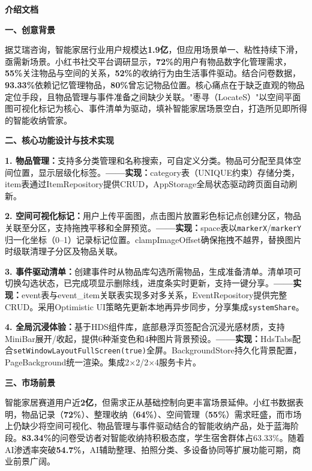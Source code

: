 \documentclass[UTF8,zihao=5,twoside]{ctexart}
\newcommand{\blankline}{\vspace{\baselineskip}\par}
\newcommand{\secondheading}[1]{{\noindent\zihao{4}\bfseries #1\par}}
\newcommand{\thirdheading}[1]{{\noindent\zihao{-4}\bfseries #1\par}}
\begin{document}
\blankline

\secondheading{介绍文档}

\blankline

\thirdheading{一、创意背景}

据艾瑞咨询，智能家居行业用户规模达\textbf{1.9亿}，但应用场景单一、粘性持续下滑，亟需新场景。小红书社交平台调研显示，\textbf{72\%}的用户有物品数字化管理需求，\textbf{55\%}关注物品与空间的关系，\textbf{52\%}的收纳行为由生活事件驱动。结合问卷数据，\textbf{93.33\%}依赖记忆管理物品，\textbf{80\%}曾忘记物品位置。核心痛点在于缺乏直观的物品定位手段，且物品管理与事件准备之间缺少关联。"枣寻（LocateS）"以空间平面图可视化标记为核心、事件清单为驱动，填补智能家居场景空白，打造所见即所得的智能收纳管家。

\thirdheading{二、核心功能设计与技术实现}

\textbf{1. 物品管理：}支持多分类管理和名称搜索，可自定义分类。物品可分配至具体空间位置，显示层级化标签。\textbf{——实现：}category表（UNIQUE约束）存储分类，item表通过ItemRepository提供CRUD，AppStorage全局状态驱动跨页面自动刷新。

\textbf{2. 空间可视化标记：}用户上传平面图，点击图片放置彩色标记点创建分区，物品关联至分区，支持拖拽平移和全屏预览。\textbf{——实现：}space表以\verb|markerX|/\verb|markerY|归一化坐标（0–1）记录标记位置。clampImageOffset确保拖拽不越界，替换图片时级联清理子分区及物品关联。

\textbf{3. 事件驱动清单：}创建事件时从物品库勾选所需物品，生成准备清单。清单项可切换勾选状态，已完成项显示删除线，进度条实时更新，支持一键分享。\textbf{——实现：}event表与event\_item关联表实现多对多关系，EventRepository提供完整CRUD。采用Optimistic UI策略先更新本地再异步同步，分享集成\verb|systemShare|。

\textbf{4. 全局沉浸体验：}基于HDS组件库，底部悬浮页签配合沉浸光感材质，支持MiniBar展开/收起，提供6种渐变色和4种图片背景预设。\textbf{——实现：}HdsTabs配合\verb|setWindowLayoutFullScreen(true)|全屏。BackgroundStore持久化背景配置，PageBackground统一渲染。集成2×2/2×4服务卡片。

\thirdheading{三、市场前景}

智能家居赛道用户近\textbf{2亿}，但需求正从基础控制向更丰富场景延伸。小红书数据表明，物品记录（\textbf{72\%}）、整理收纳（\textbf{64\%}）、空间管理（\textbf{55\%}）需求旺盛，而市场上仍缺少将空间可视化、物品管理与事件驱动结合的智能收纳产品，处于蓝海阶段。\textbf{83.34\%}的问卷受访者对智能收纳持积极态度，学生宿舍群体占63.33\%。随着AI渗透率突破\textbf{54.7\%}，AI辅助整理、拍照分类、多设备协同等扩展功能可期，商业前景广阔。
\end{document}
